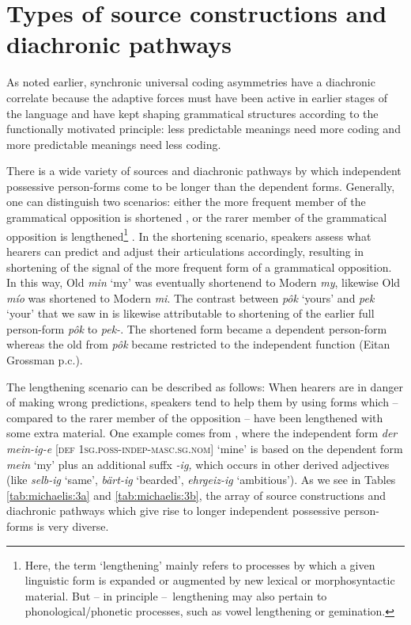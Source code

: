 \documentclass[output=paper]{langsci/langscibook}
\begin{document}
\section{Types of source constructions and diachronic pathways}\label{sec:michaelis:3}

As noted earlier, synchronic universal coding asymmetries have a diachronic correlate because the adaptive forces must have been active in earlier stages of the language and have kept shaping grammatical structures according to the functionally motivated  principle: less predictable meanings need more coding and more predictable meanings need less coding.

There is a wide variety of sources and diachronic pathways by which independent possessive person-forms come to be longer than the dependent forms. Generally, one can distinguish two scenarios: either the more frequent member of the grammatical opposition is shortened \citep{Bybee2007}, or the rarer member of the grammatical opposition is lengthened\footnote{Here, the term ‘lengthening’ mainly refers to processes by which a given linguistic form is expanded or augmented by new lexical or morphosyntactic material. But – in principle –~lengthening may also pertain to phonological/phonetic processes, such as vowel lengthening or gemination.} \citep{Haspelmath2008_Econ}. In the shortening scenario, speakers assess what hearers can predict and adjust their articulations accordingly, resulting in shortening of the signal of the more frequent form of a grammatical opposition. In this way, Old  \textit{min} ‘my’ was eventually shortenend to Modern  \textit{my}, likewise Old  \textit{mío} was shortened to Modern  \textit{mi}. The  contrast between \textit{pôk} ‘yours’ and \textit{pek} ‘your’ that we saw in  is likewise attributable to shortening of the earlier full person-form \textit{pôk} to \textit{pek-}. The shortened form became a dependent person-form whereas the old from \textit{pôk} became restricted to the independent function (Eitan Grossman p.c.).

The lengthening scenario can be described as follows: When hearers are in danger of making wrong predictions, speakers tend to help them by using forms which – compared to the rarer member of the opposition – have been lengthened with some extra material. One example comes from , where the independent form \textit{der mein-ig-e} [\textsc{def} \textsc{1sg.poss-indep-masc.sg.nom}] ‘mine’ is based on the dependent form \textit{mein} ‘my’ plus an additional suffx \textit{{}-ig,} which occurs in other derived adjectives (like \textit{selb-ig} ‘same’, \textit{bärt-ig} ‘bearded’, \textit{ehrgeiz-ig} ‘ambitious’). As we see in Tables \ref{tab:michaelis:3a} and \ref{tab:michaelis:3b}, the array of source constructions and diachronic pathways which give rise to longer independent possessive person-forms is very diverse.
\end{document}
